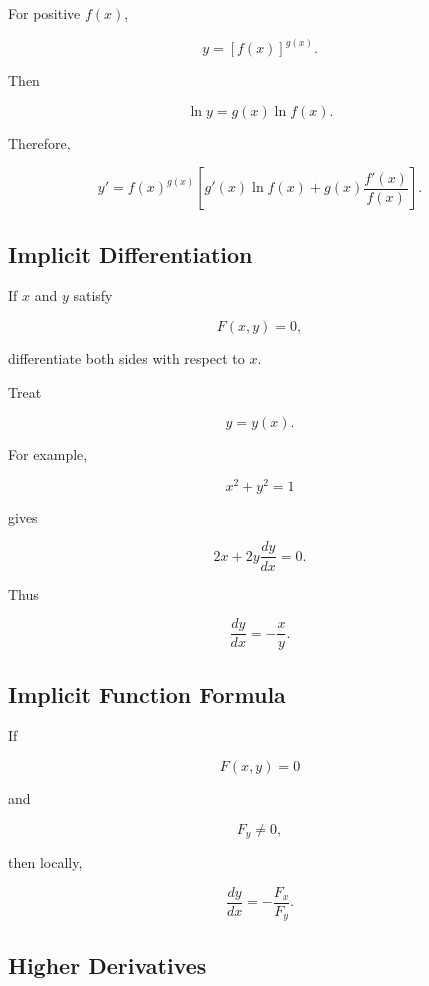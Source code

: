 For positive \(f(x)\),

\[
y
=
[f(x)]^{g(x)}.
\]

Then

\[
\ln y
=
g(x)\ln f(x).
\]

Therefore,

\[
\boxed{
y'
=
f(x)^{g(x)}
\left[
g'(x)\ln f(x)
+
g(x)\frac{f'(x)}{f(x)}
\right].
}
\]

\subsection{Implicit Differentiation}
\label{subsec:implicit-differentiation-reference}

If \(x\) and \(y\) satisfy

\[
F(x,y)=0,
\]

differentiate both sides with respect to \(x\).

Treat

\[
y=y(x).
\]

For example,

\[
x^2+y^2=1
\]

gives

\[
2x
+
2y\frac{dy}{dx}
=
0.
\]

Thus

\[
\boxed{
\frac{dy}{dx}
=
-\frac{x}{y}.
}
\]

\subsection{Implicit Function Formula}
\label{subsec:implicit-function-derivative-formula}

If

\[
F(x,y)=0
\]

and

\[
F_y\neq0,
\]

then locally,

\[
\boxed{
\frac{dy}{dx}
=
-\frac{
F_x
}{
F_y
}.
}
\]

\subsection{Higher Derivatives}
\label{subsec:higher-derivatives-reference}

